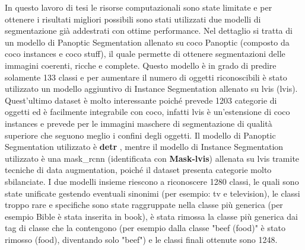 In questo lavoro di tesi le risorse computazionali sono state limitate e per ottenere i risultati migliori possibili sono stati utilizzati due modelli di segmentazione già addestrati con ottime performance.
Nel dettaglio si tratta di un modello di Panoptic Segmentation allenato su \acrshort{coco} Panoptic \cite{lin2014microsoft} (composto da \acrshort{coco} instances e \acrshort{coco} stuff), il quale permette di ottenere segmentazioni delle immagini coerenti, ricche e complete.
Questo modello è in grado di predire solamente 133 classi e per aumentare il numero di oggetti riconoscibili è stato utilizzato un modello aggiuntivo di Instance Segmentation allenato su \acrshort{lvis} \cite{gupta2019lvis} (\acrlong{lvis}).
Quest'ultimo dataset è molto interessante poiché prevede 1203 categorie di oggetti ed è facilmente integrabile con \acrshort{coco}, infatti \acrshort{lvis} è un'estensione di \acrshort{coco} instances e prevede per le immagini maschere di segmentazione di qualità superiore che seguono meglio i confini degli oggetti.
Il modello di Panoptic Segmentation utilizzato è \textbf{\acrshort{detr}} \cite{carion2020end}, mentre il modello di Instance Segmentation utilizzato è una \acrshort{mask_rcnn} \cite{gupta2019lvis, he2017mask} (identificata con \textbf{Mask-\acrshort{lvis}}) allenata su \acrshort{lvis} tramite tecniche di data augmentation, poiché il dataset presenta categorie molto sbilanciate.
I due modelli insieme riescono a riconoscere 1280 classi, le quali sono state unificate gestendo eventuali sinonimi (per esempio: tv e television), le classi troppo rare e specifiche sono state raggruppate nella classe più generica (per esempio Bible è stata inserita in book),  è stata rimossa la classe più generica dai tag di classe che la contengono (per esempio dalla classe "beef (food)" è stato rimosso (food), diventando solo "beef") e le classi finali ottenute sono 1248.



